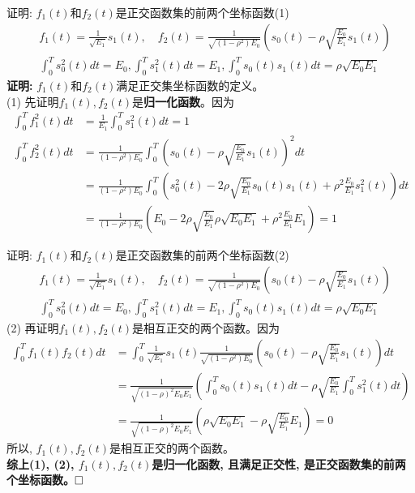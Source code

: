 \begin{frame}[shrink]{证明: $f_1(t)$和$f_2(t)$是正交函数集的前两个坐标函数(1)}
\begin{align*}
&f_1(t)=\frac{1}{\sqrt{E_1}}s_1(t),\quad f_2(t)=\frac{1}{\sqrt{(1-\rho^2)E_0}}\left(s_0(t)-\rho\sqrt{\frac{E_0}{E_1}}s_1(t)\right)\\
&\int_{0}^{T}s_0^2(t)dt=E_0, \int_{0}^{T}s_1^2(t)dt=E_1, \int_{0}^{T}s_0(t)s_1(t)dt=\rho\sqrt{E_0E_1}
\end{align*}
\textbf{证明: } $f_1(t)$和$f_2(t)$满足正交集坐标函数的定义。\\
(1) 先证明$f_1(t), f_2(t)$是\textbf{归一化函数}。因为
\begin{align*}
\int_{0}^{T}f_1^2(t)dt&=\frac{1}{E_1}\int_{0}^{T}s_1^2(t)dt=1\\
\int_{0}^{T}f_2^2(t)dt&=\frac{1}{(1-\rho^2)E_0}\int_{0}^{T}\left(s_0(t)-\rho\sqrt{\frac{E_0}{E_1}}s_1(t)\right)^2dt\\
&=\frac{1}{(1-\rho^2)E_0}\int_{0}^{T}\left(s_0^2(t)-2\rho\sqrt{\frac{E_0}{E_1}}s_0(t)s_1(t)+\rho^2\frac{E_0}{E_1}s_1^2(t)\right)dt\\
&=\frac{1}{(1-\rho^2)E_0}\left(E_0-2\rho\sqrt{\frac{E_0}{E_1}}\rho\sqrt{E_0E_1}+\rho^2\frac{E_0}{E_1}E_1\right)=1
\end{align*}
\end{frame}

\begin{frame}[shrink]{证明: $f_1(t)$和$f_2(t)$是正交函数集的前两个坐标函数(2)}
\begin{align*}
&f_1(t)=\frac{1}{\sqrt{E_1}}s_1(t),\quad f_2(t)=\frac{1}{\sqrt{(1-\rho^2)E_0}}\left(s_0(t)-\rho\sqrt{\frac{E_0}{E_1}}s_1(t)\right)\\
&\int_{0}^{T}s_0^2(t)dt=E_0, \int_{0}^{T}s_1^2(t)dt=E_1, \int_{0}^{T}s_0(t)s_1(t)dt=\rho\sqrt{E_0E_1}
\end{align*}
(2) 再证明$f_1(t), f_2(t)$是相互正交的两个函数。因为
\begin{align*}
\int_{0}^{T}f_1(t)f_2(t)dt&=\int_{0}^{T}\frac{1}{\sqrt{E_1}}s_1(t)
\frac{1}{\sqrt{(1-\rho^2)E_0}}\left(s_0(t)-\rho\sqrt{\frac{E_0}{E_1}}s_1(t)\right)dt\\
&=\frac{1}{\sqrt{(1-\rho)^2E_0E_1}}\left(\int_{0}^{T}s_0(t)s_1(t)dt-\rho\sqrt{\frac{E_0}{E_1}}\int_{0}^{T}s_1^2(t)dt\right)\\
&=\frac{1}{\sqrt{(1-\rho)^2E_0E_1}}\left(\rho\sqrt{E_0E_1}-\rho\sqrt{\frac{E_0}{E_1}}E_1\right)=0
\end{align*}
所以, $f_1(t), f_2(t)$是相互正交的两个函数。\\
\textbf{综上(1), (2), $f_1(t), f_2(t)$是归一化函数, 且满足正交性, 是正交函数集的前两个坐标函数。}$\hfill\square$
\end{frame}

